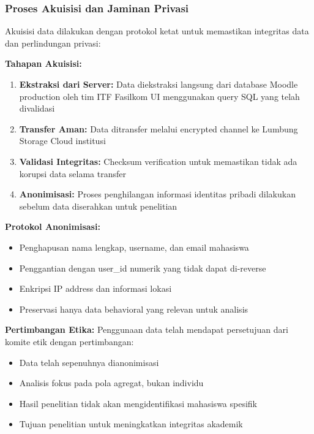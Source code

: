 \subsubsection{Proses Akuisisi dan Jaminan Privasi}
\label{sec:prosesAkuisisiPrivasi}

Akuisisi data dilakukan dengan protokol ketat untuk memastikan integritas data dan perlindungan privasi:

\textbf{Tahapan Akuisisi:}
\begin{enumerate}
    \item \textbf{Ekstraksi dari Server:} Data diekstraksi langsung dari database Moodle production oleh tim ITF Fasilkom UI menggunakan query SQL yang telah divalidasi
    \item \textbf{Transfer Aman:} Data ditransfer melalui encrypted channel ke Lumbung Storage Cloud institusi
    \item \textbf{Validasi Integritas:} Checksum verification untuk memastikan tidak ada korupsi data selama transfer
    \item \textbf{Anonimisasi:} Proses penghilangan informasi identitas pribadi dilakukan sebelum data diserahkan untuk penelitian
\end{enumerate}

\textbf{Protokol Anonimisasi:}
\begin{itemize}
    \item Penghapusan nama lengkap, username, dan email mahasiswa
    \item Penggantian dengan user\_id numerik yang tidak dapat di-reverse
    \item Enkripsi IP address dan informasi lokasi
    \item Preservasi hanya data behavioral yang relevan untuk analisis
\end{itemize}

\textbf{Pertimbangan Etika:}
Penggunaan data telah mendapat persetujuan dari komite etik dengan pertimbangan:
\begin{itemize}
    \item Data telah sepenuhnya dianonimisasi
    \item Analisis fokus pada pola agregat, bukan individu
    \item Hasil penelitian tidak akan mengidentifikasi mahasiswa spesifik
    \item Tujuan penelitian untuk meningkatkan integritas akademik
\end{itemize}

